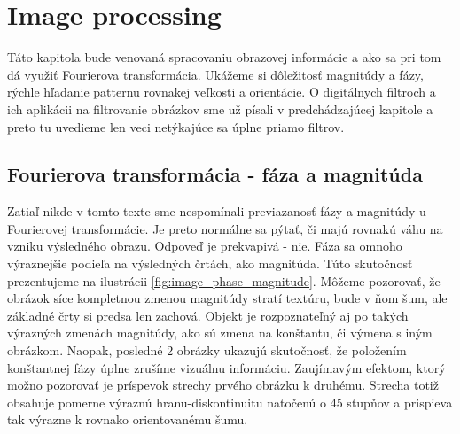 \section{Image processing}

Táto kapitola bude venovaná spracovaniu obrazovej informácie a ako sa
pri tom dá využiť Fourierova transformácia. Ukážeme si dôležitosť
magnitúdy a fázy, rýchle hľadanie patternu rovnakej
veľkosti a orientácie. O digitálnych filtroch a ich aplikácii
na filtrovanie obrázkov sme už písali v predchádzajúcej kapitole a
preto tu uvedieme len veci netýkajúce sa úplne priamo filtrov.

\subsection{Fourierova transformácia - fáza a magnitúda}
Zatiaľ nikde v tomto texte sme nespomínali previazanosť fázy a
magnitúdy u Fourierovej transformácie. Je preto normálne sa pýtať, či
majú rovnakú váhu na vzniku výsledného obrazu. Odpoveď je prekvapivá -
nie. Fáza sa omnoho výraznejšie podieľa na výsledných črtách, ako
magnitúda. Túto skutočnosť prezentujeme na ilustrácii
\ref{fig:image_phase_magnitude}. Môžeme pozorovať, že obrázok síce
kompletnou zmenou magnitúdy stratí textúru, bude v ňom šum, ale
základné črty si predsa len zachová. Objekt je rozpoznateľný aj po
takých výrazných zmenách magnitúdy, ako sú zmena na konštantu, či
výmena s iným obrázkom. Naopak, posledné 2 obrázky ukazujú skutočnosť,
že položením konštantnej fázy úplne zrušíme vizuálnu informáciu.
Zaujímavým efektom, ktorý možno pozorovať je príspevok strechy prvého
obrázku k druhému. Strecha totiž obsahuje pomerne výraznú
hranu-diskontinuitu natočenú o 45 stupňov a prispieva tak výrazne
k rovnako orientovanému šumu.

